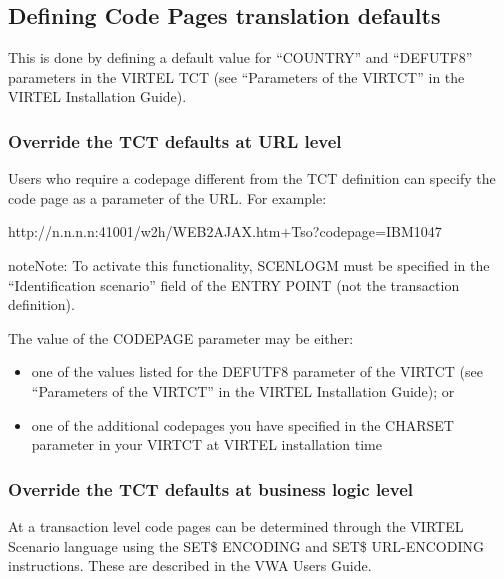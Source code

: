 \documentclass[letterpaper,10pt,english]{sphinxmanual}
\begin{document}
\subsection{Defining Code Pages translation defaults}
\label{\detokenize{User_Guide:defining-code-pages-translation-defaults}}
This is done by defining a default value for “COUNTRY” and “DEFUTF8” parameters in the VIRTEL TCT (see “Parameters of the VIRTCT” in the VIRTEL Installation Guide).


\subsubsection{Override the TCT defaults at URL level}
\label{\detokenize{User_Guide:override-the-tct-defaults-at-url-level}}
Users who require a codepage different from the TCT definition can specify the code page as a parameter of the URL.
For example:

\begin{sphinxVerbatim}[commandchars=\\\{\}]
http://n.n.n.n:41001/w2h/WEB2AJAX.htm+Tso?codepage=IBM1047
\end{sphinxVerbatim}

\begin{sphinxadmonition}{note}{Note:}
To activate this functionality, SCENLOGM must be specified in the “Identification scenario” field of the ENTRY POINT (not the transaction definition).
\end{sphinxadmonition}

The value of the CODEPAGE parameter may be either:
\begin{itemize}
\item {} 
one of the values listed for the DEFUTF8 parameter of the VIRTCT (see “Parameters of the VIRTCT” in the VIRTEL Installation Guide); or

\item {} 
one of the additional codepages you have specified in the CHARSET parameter in your VIRTCT at VIRTEL installation time

\end{itemize}


\subsubsection{Override the TCT defaults at business logic level}
\label{\detokenize{User_Guide:override-the-tct-defaults-at-business-logic-level}}
At a transaction level code pages can be determined through the VIRTEL Scenario language using the SET\$ ENCODING
and SET\$ URL-ENCODING instructions. These are described in the VWA Users Guide.
\end{document}
